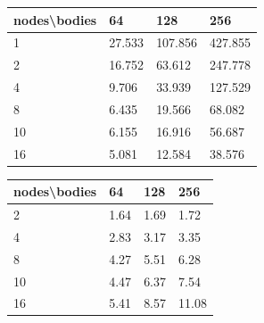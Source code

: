 \documentclass[a4paper]{article}
\begin{document}
\begin{minipage}[b]{.40\textwidth}
  \centering
  \begin{tabular}{l|l|l|l}
  \centering
nodes\textbackslash bodies & 64 & 128 & 256 \\ \hline
1 & 27.533 & 107.856 & 427.855 \\ \hline
2 & 16.752 & 63.612 & 247.778 \\ \hline
4 & 9.706 & 33.939 & 127.529 \\ \hline
8 & 6.435 & 19.566 & 68.082 \\ \hline
10 & 6.155 & 16.916 & 56.687 \\ \hline
16 & 5.081 & 12.584 & 38.576 \\ 
    \hline
  \end{tabular}
  \label{tab:R1_t1}
\end{minipage} \qquad
\begin{minipage}[b]{.40\textwidth}
  \centering
  \begin{tabular}{l|l|l|l}
nodes\textbackslash bodies & 64 & 128 & 256 \\ \hline
2 & 1.64 & 1.69 & 1.72 \\ \hline
4 & 2.83 & 3.17 & 3.35 \\ \hline
8 & 4.27 & 5.51 & 6.28 \\ \hline
10 & 4.47 & 6.37 & 7.54 \\ \hline
16 & 5.41 & 8.57 & 11.08 \\ 
  \hline
  \end{tabular}
  \label{tab:R1_t2}
\end{minipage}
\end{document}
